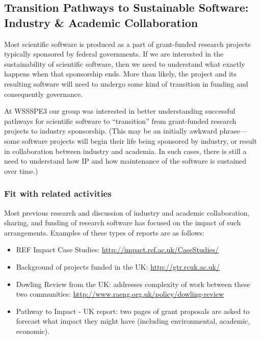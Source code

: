 
\subsection{Transition Pathways to Sustainable Software: Industry \& Academic Collaboration}
\label{sec:industry_interaction}


Most scientific software is produced as a part of grant-funded research projects
typically sponsored by federal governments. If we are interested in the
sustainability of scientific software, then we need to understand what exactly
happens when that sponsorship ends. More than likely, the project and its
resulting software will need to undergo some kind of transition in funding and
consequently governance.

At WSSSPE3 our group was interested in better understanding successful pathways
for scientific software to ``transition'' from grant-funded research projects to
industry sponsorship. (This may be an initially awkward phrase---some software
projects will begin their life being sponsored by industry, or result in
collaboration between industry and academia. In such cases, there is still a
need to understand how IP and how maintenance of the software is sustained over
time.)

\subsubsection{Fit with related activities}

Most previous research and discussion of industry and academic collaboration,
sharing, and funding of research software has focused on the impact of such
arrangements. Examples of these types of reports are as follows:

\begin{itemize}
\item REF Impact Case Studies: \url{http://impact.ref.ac.uk/CaseStudies/}
\item Background of projects funded in the UK: \url{http://gtr.rcuk.ac.uk/}
\item Dowling Review from the UK: addresses complexity of work between these two
communities: \url{http://www.raeng.org.uk/policy/dowling-review}
\item Pathway to Impact - UK report: two pages of grant proposals are asked to
forecast what impact they might have (including environmental, academic, economic).
\end{itemize}

